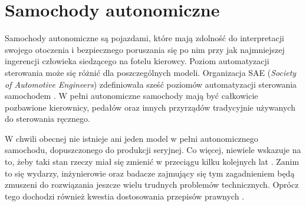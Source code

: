 \chapter{Samochody autonomiczne}
\vspace{-1cm}
Samochody autonomiczne są pojazdami, które mają zdolność do interpretacji swojego otoczenia i bezpiecznego poruszania się po nim przy jak najmniejszej ingerencji człowieka siedzącego na fotelu kierowcy. Poziom automatyzacji sterowania może się różnić dla poszczególnych modeli. Organizacja SAE (\textit{Society of Automotive Engineers}) zdefiniowała sześć poziomów automatyzacji sterowania samochodem \cite{synopsys:whatIsAutonomousCar}. W pełni autonomiczne samochody mają być całkowicie pozbawione kierownicy, pedałów oraz innych przyrządów tradycyjnie używanych do sterowania ręcznego.

W chwili obecnej nie istnieje ani jeden model w pełni autonomicznego samochodu, dopuszczonego do produkcji seryjnej. Co więcej, niewiele wskazuje na to, żeby taki stan rzeczy miał się zmienić w przeciągu kilku kolejnych lat \cite{adams:yearsAwaySDCs}\cite{houwelling:wontGetSdcSoon}. Zanim to się wydarzy, inżynierowie oraz badacze zajmujący się tym zagadnieniem będą zmuszeni do rozwiązania jeszcze wielu trudnych problemów technicznych. Oprócz tego dochodzi również kwestia dostosowania przepisów prawnych \cite{businessInsider:autonomiczneAutaPrawo}.

